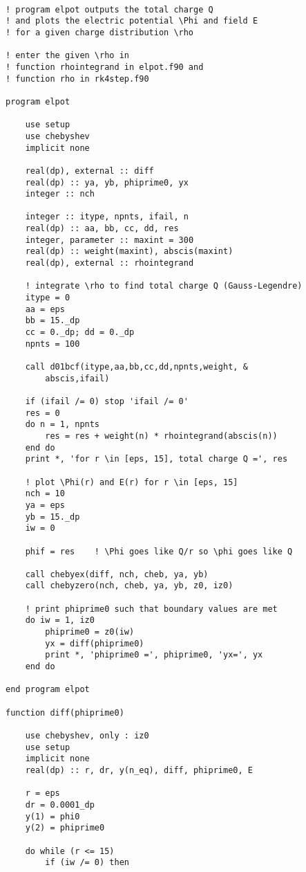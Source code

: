 \documentclass[12pt]{article}
\begin{document}
\begin{lstlisting}[frame=single,caption={{\tt elpot.f90}},label=elpot]

! program elpot outputs the total charge Q
! and plots the electric potential \Phi and field E
! for a given charge distribution \rho

! enter the given \rho in 
! function rhointegrand in elpot.f90 and
! function rho in rk4step.f90

program elpot

    use setup
    use chebyshev
    implicit none
  
    real(dp), external :: diff
    real(dp) :: ya, yb, phiprime0, yx
    integer :: nch
    
    integer :: itype, npnts, ifail, n
    real(dp) :: aa, bb, cc, dd, res
    integer, parameter :: maxint = 300
    real(dp) :: weight(maxint), abscis(maxint)
    real(dp), external :: rhointegrand

    ! integrate \rho to find total charge Q (Gauss-Legendre)
    itype = 0
    aa = eps
    bb = 15._dp
    cc = 0._dp; dd = 0._dp
    npnts = 100

    call d01bcf(itype,aa,bb,cc,dd,npnts,weight, &
        abscis,ifail)

    if (ifail /= 0) stop 'ifail /= 0'
    res = 0
    do n = 1, npnts
        res = res + weight(n) * rhointegrand(abscis(n))
    end do
    print *, 'for r \in [eps, 15], total charge Q =', res 

    ! plot \Phi(r) and E(r) for r \in [eps, 15]
    nch = 10
    ya = eps
    yb = 15._dp 
    iw = 0
    
    phif = res    ! \Phi goes like Q/r so \phi goes like Q

    call chebyex(diff, nch, cheb, ya, yb)
    call chebyzero(nch, cheb, ya, yb, z0, iz0)

    ! print phiprime0 such that boundary values are met
    do iw = 1, iz0 
        phiprime0 = z0(iw) 
        yx = diff(phiprime0)
        print *, 'phiprime0 =', phiprime0, 'yx=', yx 
    end do

end program elpot

function diff(phiprime0) 

    use chebyshev, only : iz0
    use setup
    implicit none
    real(dp) :: r, dr, y(n_eq), diff, phiprime0, E

    r = eps
    dr = 0.0001_dp 
    y(1) = phi0
    y(2) = phiprime0

    do while (r <= 15) 
        if (iw /= 0) then


\end{lstlisting}
\end{document}
